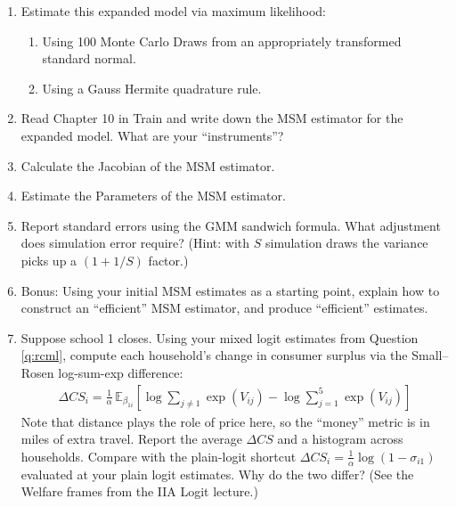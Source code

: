 \documentclass{article}
\begin{document}
\begin{enumerate}
	\item \label{q:rcml} Estimate this expanded model via maximum likelihood:
	\begin{enumerate}
		\item Using 100 Monte Carlo Draws from an appropriately transformed standard normal.
		\item Using a Gauss Hermite quadrature rule.
	\end{enumerate}
	\item Read Chapter 10 in Train and write down the MSM estimator for the expanded model. What are your ``instruments''?
	\item Calculate the Jacobian of the MSM estimator.
	\item Estimate the Parameters of the MSM estimator.
	\item Report standard errors using the GMM sandwich formula. What adjustment does simulation error require? (Hint: with $S$ simulation draws the variance picks up a $(1+1/S)$ factor.)
	\item Bonus: Using your initial MSM estimates as a starting point, explain how to construct an ``efficient'' MSM estimator, and produce ``efficient'' estimates.
	\item Suppose school 1 closes. Using your mixed logit estimates from Question \ref{q:rcml}, compute each household's change in consumer surplus via the Small--Rosen log-sum-exp difference:
	\begin{align*}
	\Delta CS_i = \frac{1}{\alpha} \, \mathbb{E}_{\beta_{1i}}\left[ \log \sum_{j \neq 1} \exp(V_{ij}) - \log \sum_{j=1}^{5} \exp(V_{ij}) \right]
	\end{align*}
	Note that distance plays the role of price here, so the ``money'' metric is in miles of extra travel. Report the average $\Delta CS$ and a histogram across households. Compare with the plain-logit shortcut $\Delta CS_i = \frac{1}{\alpha} \log(1-\sigma_{i1})$ evaluated at your plain logit estimates. Why do the two differ? (See the Welfare frames from the IIA Logit lecture.)
\end{enumerate}
\end{document}
